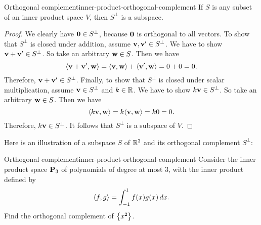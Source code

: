 \begin{proposition}{Orthogonal complement}{inner-product-orthogonal-complement}
  If $S$ is any subset of an inner product space $V$, then $S^{\perp}$
  is a subspace.
\end{proposition}

\begin{proof}
  We clearly have $\vect{0}\in S^{\perp}$, because $\vect{0}$ is
  orthogonal to all vectors. To show that $S^{\perp}$ is closed under
  addition, assume $\vect{v}, \vect{v}'\in S^{\perp}$. We have to show
  $\vect{v}+\vect{v}'\in S^{\perp}$. So take an arbitrary $\vect{w}\in
  S$. Then we have
  \begin{equation*}
    \iprod{\vect{v}+\vect{v}',\vect{w}}
    = \iprod{\vect{v},\vect{w}} + \iprod{\vect{v}',\vect{w}}
    = 0 + 0 = 0.
  \end{equation*}
  Therefore, $\vect{v}+\vect{v}'\in S^{\perp}$. Finally, to show that
  $S^{\perp}$ is closed under scalar multiplication, assume
  $\vect{v}\in S^{\perp}$ and $k\in\mathbb{R}$. We have to show
  $k\vect{v}\in S^{\perp}$. So take an arbitrary
  $\vect{w}\in S$. Then we have
  \begin{equation*}
    \iprod{k\vect{v},\vect{w}}
    = k\iprod{\vect{v},\vect{w}}
    = k0 = 0.
  \end{equation*}
  Therefore, $k\vect{v}\in S^{\perp}$. It follows that $S^{\perp}$ is
  a subspace of $V$.
\end{proof}

Here is an illustration of a subspace $S$ of $\mathbb{R}^3$ and its orthogonal
complement $S^{\perp}$:

\begin{center}
\end{center}

\begin{example}{Orthogonal complement}{inner-product-orthogonal-complement}
  Consider the inner product space $\mathbf{P}_3$ of polynomials of degree
  at most $3$, with the inner product defined by
  \begin{equation*}
    \langle f,g\rangle = \int_{-1}^{1} f(x)g(x)\,dx.
  \end{equation*}
  Find the orthogonal complement of $\left\{x^2\right\}$.
\end{example}

